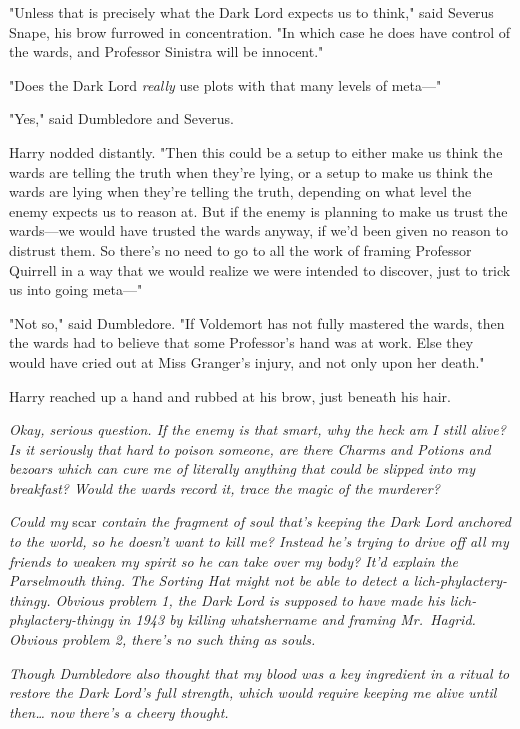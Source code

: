 "Unless that is precisely what the Dark Lord expects us to think," said Severus
Snape, his brow furrowed in concentration. "In which case he does have control
of the wards, and Professor Sinistra will be innocent."

"Does the Dark Lord \emph{really} use plots with that many levels of meta---"

"Yes," said Dumbledore and Severus.

Harry nodded distantly. "Then this could be a setup to either make us think the
wards are telling the truth when they're lying, or a setup to make us think the
wards are lying when they're telling the truth, depending on what level the
enemy expects us to reason at. But if the enemy is planning to make us trust
the wards---we would have trusted the wards anyway, if we'd been given no
reason to distrust them. So there's no need to go to all the work of framing
Professor Quirrell in a way that we would realize we were intended to discover,
just to trick us into going meta---"

"Not so," said Dumbledore. "If Voldemort has not fully mastered the wards, then
the wards had to believe that some Professor's hand was at work. Else they
would have cried out at Miss Granger's injury, and not only upon her death."

Harry reached up a hand and rubbed at his brow, just beneath his hair.

\emph{Okay, serious question. If the enemy is that smart, why the heck am I
still alive? Is it seriously that hard to poison someone, are there Charms and
Potions and bezoars which can cure me of literally anything that could be
slipped into my breakfast? Would the wards record it, trace the magic of the
murderer?}

\emph{Could my} scar \emph{contain the fragment of soul that's keeping the Dark
Lord anchored to the world, so he doesn't want to kill me? Instead he's trying
to drive off all my friends to weaken my spirit so he can take over my body?
It'd explain the Parselmouth thing. The Sorting Hat might not be able to detect
a lich-phylactery-thingy. Obvious problem 1, the Dark Lord is supposed to have
made his lich-phylactery-thingy in 1943 by killing whatshername and framing
Mr.~Hagrid. Obvious problem 2, there's no such thing as souls.}

\emph{Though Dumbledore also thought that my blood was a key ingredient in a
ritual to restore the Dark Lord's full strength, which would require keeping me
alive until then{\ldots} now there's a cheery thought.}


